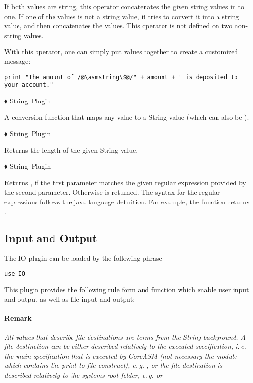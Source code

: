 \documentclass{article}
\newcommand{\funcform}[2]{\pform{$\blacklozenge$}{#1}{#2}}
\newcommand{\pform}[3]{\vspace*{4mm} \noindent #1 #2 \vspace{1mm}\textcolor[gray]{0.7}{\dotfill}\mbox{{\sffamily \footnotesize #3}}}
\begin{document}
If both values are string, this operator concatenates the given string values in to one. If one of the values is not a string value, it tries to convert it into a string value, and then concatenates the values. This operator is not defined on two non-string values.

With this operator, one can simply put values together to create a customized message:

\begin{lstlisting}
print "The amount of /@\asmstring\$@/" + amount + " is deposited to your account."
\end{lstlisting}
\vspace{-1em}

\funcform{
}{String Plugin}

A conversion function that maps any value to a String value (which can also be ).

\funcform{
}{String Plugin}

Returns the length of the given String value.

\funcform{
}{String Plugin}

Returns , if the first parameter matches the given regular expression provided by the second parameter. Otherwise  is returned. The syntax for the regular expressions follows the java language definition. For example, the function  returns .

\subsection{Input and Output}
\label{io}

The IO plugin can be loaded by the following  phrase:

\begin{lstlisting}
use IO
\end{lstlisting}

\noindent This plugin provides the following rule form and function which enable user input and output as well as file input and output:

\paragraph{Remark}
\textit{All values that describe file destinations are terms from the String background. A file destination can be either described relatively to the executed specification, i.\,e. the main specification that is executed by CoreASM (not necessary the module which contains the print-to-file construct), e.\,g. , or the file destination is described relatively to the systems root folder, e.\,g.  or  }
\end{document}
